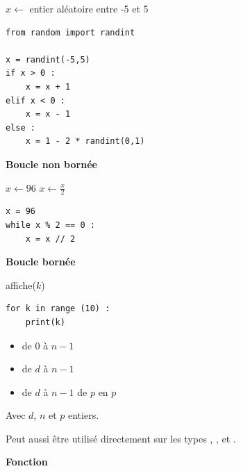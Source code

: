 \begin{multicols}{2}
\begin{algorithm}[H]
$x \leftarrow $ entier aléatoire entre -5 et 5\;
\end{algorithm}

\vspace{-1ex}
\begin{verbatim}
from random import randint

x = randint(-5,5)
if x > 0 :
    x = x + 1
elif x < 0 :
    x = x - 1
else :
    x = 1 - 2 * randint(0,1)
\end{verbatim}



\medskip
{\bfseries Boucle non bornée}

\begin{algorithm}[H]
$x \leftarrow 96$\;
{   
    $x \leftarrow \frac{x}{2}$\;
}
\end{algorithm}

\vspace{-1ex}
\begin{verbatim}
x = 96
while x % 2 == 0 :
    x = x // 2
\end{verbatim}


\medskip
{\bfseries Boucle bornée}

\begin{algorithm}[H]
{ affiche($k$)\; }
\end{algorithm}

\vspace{-1ex}
\begin{verbatim}
for k in range (10) :
    print(k)
\end{verbatim}

\begin{itemize}
	\item {} de $0$ à $n-1$
	\item {} de $d$ à $n-1$
	\item {} de $d$ à $n-1$ de $p$ en $p$
\end{itemize}

Avec $d$, $n$ et $p$ entiers.

Peut aussi être utilisé directement sur les types , ,  et .


\medskip
{\bfseries Fonction}



\end{multicols}
